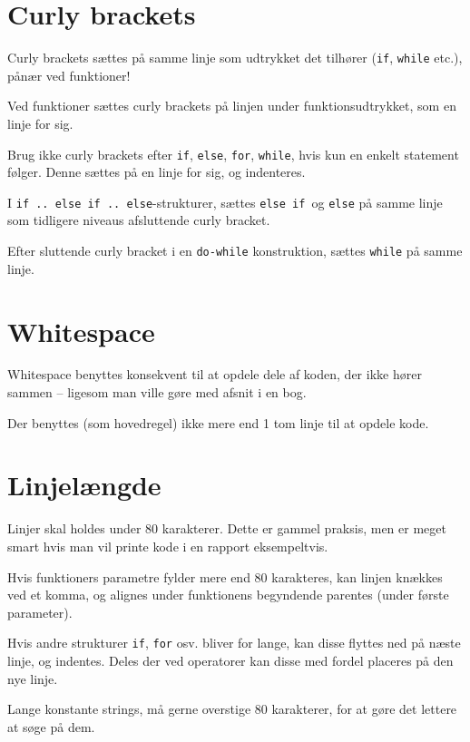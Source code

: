 \documentclass[article, 10pt]{memoir}
\let\tempone\itemize
\let\temptwo\enditemize
\renewenvironment{itemize}{\tempone\firmlist}{\temptwo}
\begin{document}
\begin{multicols}{2}
    \section{Curly brackets}
    \begin{itemize}
        \item Curly brackets sættes på samme linje som udtrykket det tilhører (\texttt{if}, \texttt{while} etc.), pånær ved funktioner!
        \item Ved funktioner sættes curly brackets på linjen under funktionsudtrykket, som en linje for sig.
        \item Brug ikke curly brackets efter \texttt{if}, \texttt{else}, \texttt{for}, \texttt{while}, hvis kun en enkelt statement følger. Denne sættes på en linje for sig, og indenteres.
        \item I \texttt{if .. else if .. else}-strukturer, sættes \texttt{else if }og \texttt{else} på samme linje som tidligere niveaus afsluttende curly bracket.
        \item Efter sluttende curly bracket i en \texttt{do-while} konstruktion, sættes \texttt{while} på samme linje.
    \end{itemize}

    \section{Whitespace}
    \begin{itemize}
        \item Whitespace benyttes konsekvent til at opdele dele af koden, der ikke hører sammen -- ligesom man ville gøre med afsnit i en bog.
        \item Der benyttes (som hovedregel) ikke mere end 1 tom linje til at opdele kode.
    \end{itemize}

    \section{Linjelængde}
    \begin{itemize}
        \item Linjer skal holdes under 80 karakterer. Dette er gammel praksis, men er meget smart hvis man vil printe kode i en rapport eksempeltvis.
        \item Hvis funktioners parametre fylder mere end 80 karakteres, kan linjen knækkes ved et komma, og alignes under funktionens begyndende parentes (under første parameter).
        \item Hvis andre strukturer \texttt{if}, \texttt{for} osv. bliver for lange, kan disse flyttes ned på næste linje, og indentes. Deles der ved operatorer kan disse med fordel placeres på den nye linje.
        \item Lange konstante strings, må gerne overstige 80 karakterer, for at gøre det lettere at søge på dem.
    \end{itemize}


\end{multicols}
\end{document}
